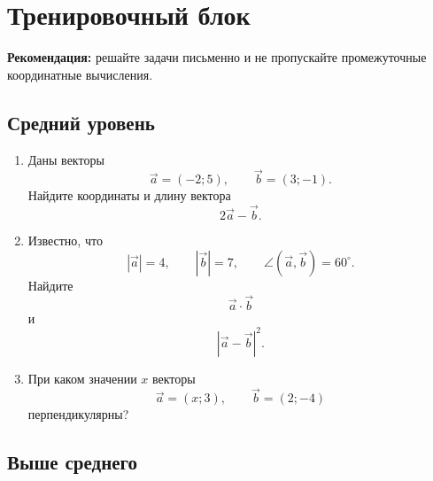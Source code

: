 \documentclass[a4paper,12pt]{article}
\newcommand{\vct}[1]{\vec{#1}}
\begin{document}

\clearpage
\section*{\color{darkaccent}Тренировочный блок}

\textbf{Рекомендация:}
решайте задачи письменно и не пропускайте промежуточные координатные
вычисления.

\subsection*{\color{accent}Средний уровень}

\begin{enumerate}[label=\textbf{\arabic*.}]

\item
Даны векторы
\[
\vct a=(-2;5),
\qquad
\vct b=(3;-1).
\]
Найдите координаты и длину вектора
\[
2\vct a-\vct b.
\]

\item
Известно, что
\[
|\vct a|=4,
\qquad
|\vct b|=7,
\qquad
\angle(\vct a,\vct b)=60^\circ.
\]
Найдите
\[
\vct a\cdot\vct b
\]
и
\[
|\vct a-\vct b|^2.
\]

\item
При каком значении $x$ векторы
\[
\vct a=(x;3),
\qquad
\vct b=(2;-4)
\]
перпендикулярны?

\end{enumerate}

\subsection*{\color{accent}Выше среднего}
\end{document}
